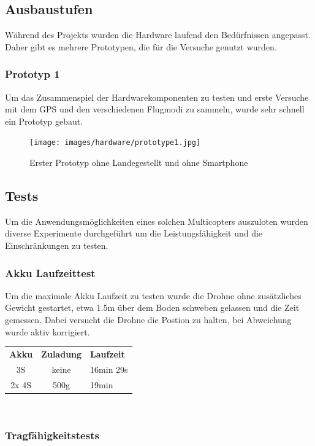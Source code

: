 \subsection{Ausbaustufen}

Während des Projekts wurden die Hardware laufend den Bedürfnissen angepasst. Daher gibt es mehrere Prototypen, die für die Versuche genutzt wurden.

\subsubsection{Prototyp 1}

Um das Zusammenspiel der Hardwarekomponenten zu testen und erste Versuche mit dem GPS und den verschiedenen Flugmodi zu sammeln, wurde sehr schnell ein Prototyp gebaut.

\begin{figure}[h]
	\centering
	\texttt{[image: images/hardware/prototype1.jpg]} 
	\caption{Erster Prototyp ohne Landegestellt und ohne Smartphone}
	\label{fig:prototyp-1}
\end{figure}

\subsection{Tests}

Um die Anwendungsmöglichkeiten eines solchen Multicopters auszuloten wurden diverse Experimente durchgeführt um die Leistungsfähigkeit und die Einschränkungen zu testen. 

\subsubsection{Akku Laufzeittest}
Um die maximale Akku Laufzeit zu testen wurde die Drohne ohne zusätzliches Gewicht gestartet, etwa 1.5m über dem Boden schweben gelassen und die Zeit gemessen. Dabei versucht die Drohne die Postion zu halten, bei Abweichung wurde aktiv korrigiert. \\

\begin{tabularx}{\textwidth}{|c|c|X}
    \hline
    \textbf{Akku} & \textbf{Zuladung}  & \textbf{Laufzeit} \\
    3S & keine & 16min 29s\\ \hline 
    2x 4S & 500g & 19min\\ \hline 
\end{tabularx}\\

\subsubsection{Tragfähigkeitstests}

